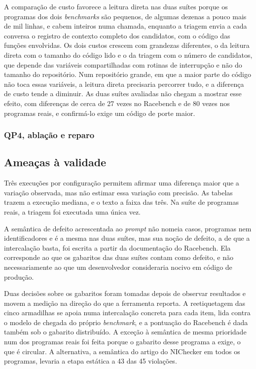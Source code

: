 A comparação de custo favorece a leitura direta nas duas suítes porque os
programas dos dois \textit{benchmarks} são pequenos, de algumas dezenas a pouco
mais de mil linhas, e cabem inteiros numa chamada, enquanto a triagem envia a
cada conversa o registro de contexto completo dos candidatos, com o código das
funções envolvidas. Os dois custos crescem com grandezas diferentes, o da
leitura direta com o tamanho do código lido e o da triagem com o número de
candidatos, que depende das variáveis compartilhadas
com rotinas de interrupção e não do tamanho do repositório. Num repositório
grande, em que a maior parte do código não toca essas variáveis, a leitura
direta precisaria percorrer tudo, e a diferença de custo tende a diminuir. As
duas suítes avaliadas não chegam a mostrar esse efeito, com diferenças de
cerca de 27 vezes no Racebench e de 80 vezes nos programas reais, e
confirmá-lo exige um código de porte maior.

\subsubsection{QP4, ablação e reparo}

\fi

\subsection{Ameaças à validade}
\label{sec:ameacas}

Três execuções por configuração permitem afirmar uma diferença maior que a
variação observada, mas não estimar essa variação com precisão. As tabelas
trazem a execução mediana, e o texto a faixa das três. Na suíte de programas reais, a triagem foi
executada uma única vez.

A semântica de defeito acrescentada ao \textit{prompt} não nomeia casos,
programas nem identificadores e é a mesma nas duas suítes, mas sua noção de
defeito, a de que a intercalação basta, foi escrita a partir da documentação do
Racebench. Ela corresponde ao que os gabaritos das duas suítes contam como
defeito, e não necessariamente ao que um desenvolvedor consideraria nocivo em
código de produção.

Duas decisões sobre os gabaritos foram tomadas depois de observar resultados e
movem a medição na direção do que a ferramenta reporta. A reetiquetagem das
cinco armadilhas se apoia numa intercalação concreta para cada item, lida
contra o modelo de chegada do próprio \textit{benchmark}, e a pontuação do
Racebench é dada também sob o gabarito distribuído. A exceção à semântica de
mesma prioridade num dos programas reais foi feita porque o gabarito desse
programa a exige, o que é circular. A alternativa, a semântica do artigo do
NIChecker em todos os programas, levaria a etapa estática a 43 das 45
violações.

